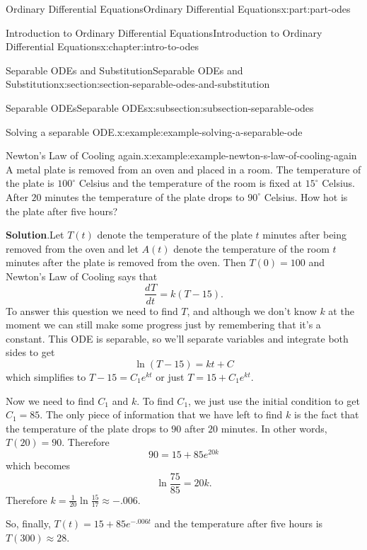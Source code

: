 \documentclass[oneside,10pt,]{book}
\newcommand{\blocktitlefont}{\relax}
\numberwithin{equation}{part}
\newcommand{\dv}[3][]{\dfrac{d^{#1} #2}{d #3^{#1}}}
\begin{document}
\begin{partptx}{Ordinary Differential Equations}{}{Ordinary Differential Equations}{}{}{x:part:part-odes}
\begin{chapterptx}{Introduction to Ordinary Differential Equations}{}{Introduction to Ordinary Differential Equations}{}{}{x:chapter:intro-to-odes}
\begin{sectionptx}{Separable ODEs and Substitution}{}{Separable ODEs and Substitution}{}{}{x:section:section-separable-odes-and-substitution}
\begin{subsectionptx}{Separable ODEs}{}{Separable ODEs}{}{}{x:subsection:subsection-separable-odes}
\begin{example}{Solving a separable ODE.}{x:example:example-solving-a-separable-ode}
\begin{equation*}
\end{equation*}
%
\end{example}
\begin{example}{Newton's Law of Cooling again.}{x:example:example-newton-s-law-of-cooling-again}%
A metal plate is removed from an oven and placed in a room. The temperature of the plate is \(100^{\circ}\) Celsius and the temperature of the room is fixed at \(15^{\circ}\) Celsius. After \(20\) minutes the temperature of the plate drops to \(90^{\circ}\) Celsius. How hot is the plate after five hours?%
\par\smallskip%
\noindent\textbf{\blocktitlefont Solution}.\hypertarget{g:solution:idp105548780090528}{}\quad{}Let \(T(t)\) denote the temperature of the plate \(t\) minutes after being removed from the oven and let \(A(t)\) denote the temperature of the room \(t\) minutes after the plate is removed from the oven. Then \(T(0) = 100\) and Newton's Law of Cooling says that%
%
\begin{equation*}
\dv{T}{t} = k(T-15).
\end{equation*}
To answer this question we need to find \(T\), and although we don't know \(k\) at the moment we can still make some progress just by remembering that it's a constant. This ODE is separable, so we'll separate variables and integrate both sides to get%
\begin{equation*}
\ln(T-15) = kt+C
\end{equation*}
which simplifies to \(T-15 = C_{1}e^{kt}\) or just \(T = 15+C_{1}e^{kt}\).%
\par
Now we need to find \(C_{1}\) and \(k\). To find \(C_{1}\), we just use the initial condition to get \(C_{1} = 85\). The only piece of information that we have left to find \(k\) is the fact that the temperature of the plate drops to \(90\) after \(20\) minutes. In other words, \(T(20) = 90\). Therefore%
\begin{equation*}
90 = 15+85e^{20k}
\end{equation*}
which becomes%
\begin{equation*}
\ln\frac{75}{85} = 20k\text{.}
\end{equation*}
Therefore \(k = \frac{1}{20}\ln\frac{15}{17}\approx-.006.\)%
\par
So, finally, \(T(t) = 15+85e^{-.006t}\) and the temperature after five hours is \(T(300)\approx28\).%
\end{example}
\end{subsectionptx}
%
%
\typeout{************************************************}

\end{sectionptx}
\end{chapterptx}
\end{partptx}
\end{document}
